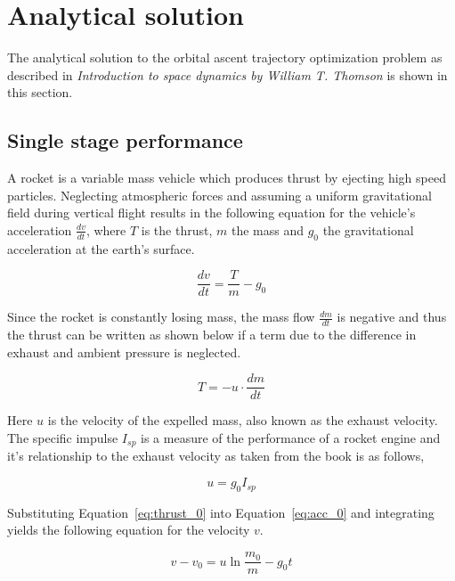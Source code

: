 \section{Analytical solution}
The analytical solution to the orbital ascent trajectory optimization problem as described in \emph{Introduction to space dynamics by William T. Thomson} \cite{thomson2012introduction} is shown in this section.

\subsection{Single stage performance}
A rocket is a variable mass vehicle which produces thrust by ejecting high speed particles. Neglecting atmospheric forces and assuming a uniform gravitational field during vertical flight results in the following equation for the vehicle's acceleration $\frac{dv}{dt}$, where $T$ is the thrust, $m$ the mass and $g_{0}$ the gravitational acceleration at the earth's surface.

\begin{equation}
    \label{eq:acc_0}
    \frac{dv}{dt} = \frac{T}{m} - g_{0}
\end{equation}

Since the rocket is constantly losing mass, the mass flow $\frac{dm}{dt}$ is negative and thus the thrust can be written as shown below if a term due to the difference in exhaust and ambient pressure is neglected.

\begin{equation}
    \label{eq:thrust_0}
    T = -u \cdot \frac{dm}{dt}
\end{equation}

Here $u$ is the velocity of the expelled mass, also known as the exhaust velocity. The specific impulse $I_{sp}$ is a measure of the performance of a rocket engine and it's relationship to the exhaust velocity as taken from the book \cite{thomson2012introduction} is as follows,

\begin{equation}
    \label{eg:isp_0}
    u=g_0I_{sp}
\end{equation}

Substituting Equation~\eqref{eq:thrust_0} into Equation~\eqref{eq:acc_0} and integrating yields the following equation for the velocity $v$.

\begin{equation}
    \label{eq:vel_0}
    v - v_0 = u \ln{\frac{m_0}{m}} - g_{0}t
\end{equation}

